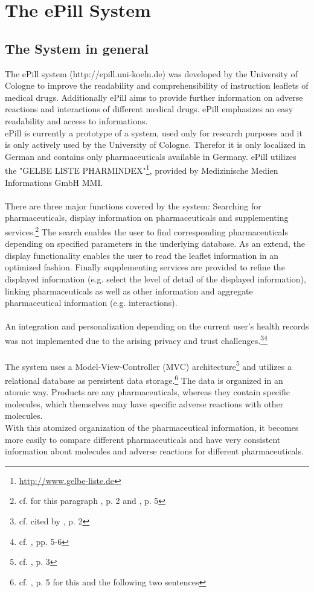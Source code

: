 \section{The ePill System}
\subsection{The System in general}
The ePill system (http://epill.uni-koeln.de) was developed by the University of Cologne to improve the readability and comprehensibility of instruction leaflets of medical drugs. Additionally ePill aims to provide further information on adverse reactions and interactions of different medical drugs. ePill emphasizes an easy readability and access to informations.
\\
ePill is currently a prototype of a system, used only for research purposes and it is only actively used by the University of Cologne. Therefor it is only localized in German and contains only pharmaceuticals available in Germany. ePill utilizes the "GELBE LISTE PHARMINDEX"\footnote{\url{http://www.gelbe-liste.de}}, provided by Medizinische Medien Informations GmbH MMI.
\\
\\
There are three major functions covered by the system: Searching for pharmaceuticals, display information on pharmaceuticals and supplementing services.\footnote{cf. for this paragraph \cite{Dehling.2012}, p. 2 and \cite{Dehling.2012b}, p. 5} The search enables the user to find corresponding pharmaceuticals depending on specified parameters in the underlying database. As an extend, the display functionality enables the user to read the leaflet information in an optimized fashion. Finally supplementing services are provided to refine the displayed information (e.g. select the level of detail of the displayed information), linking pharmaceuticals as well as other information and aggregate pharmaceutical information (e.g. interactions). 
\\
\\
An integration and personalization depending on the current user's health records was not implemented due to the arising privacy and trust challenges.\footnote{cf. \cite{Kaletsch.2011} cited by \cite{Dehling.2012}, p. 2}\footnote{cf. \cite{Kaletsch.2011}, pp. 5-6}
\\
\\
The system uses a Model-View-Controller (MVC) architecture\footnote{cf. \cite{Dehling.2012}, p. 3} and utilizes a relational database  as persistent data storage.\footnote{cf. \cite{Dehling.2012}, p. 5 for this and the following two sentences} The data is organized in an atomic way. Products are any pharmaceuticals, whereas they contain specific molecules, which themselves may have specific adverse reactions with other molecules. 
\\
With this atomized organization of the pharmaceutical information, it becomes more easily to compare different pharmaceuticals and have very consistent information about molecules and adverse reactions for different pharmaceuticals.

